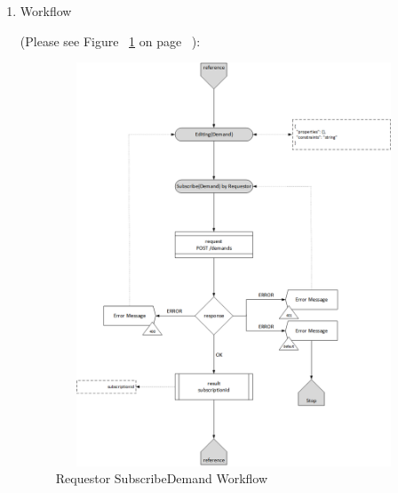 \begin{enumerate}
\item Workflow

(Please see Figure ~\ref{fig:SubsDemand} on page ~\pageref{fig:SubsDemand}):

\begin{figure}[htbp]
    \centering
    \includegraphics[width=12cm,height=12cm,angle=0]{./diag/Workflow/Market/SubscribeDemand-R-Workflow.png}
    \caption{Requestor SubscribeDemand Workflow}
	\label{fig:SubsDemand}
\end{figure}


\end{enumerate}

\newpage



